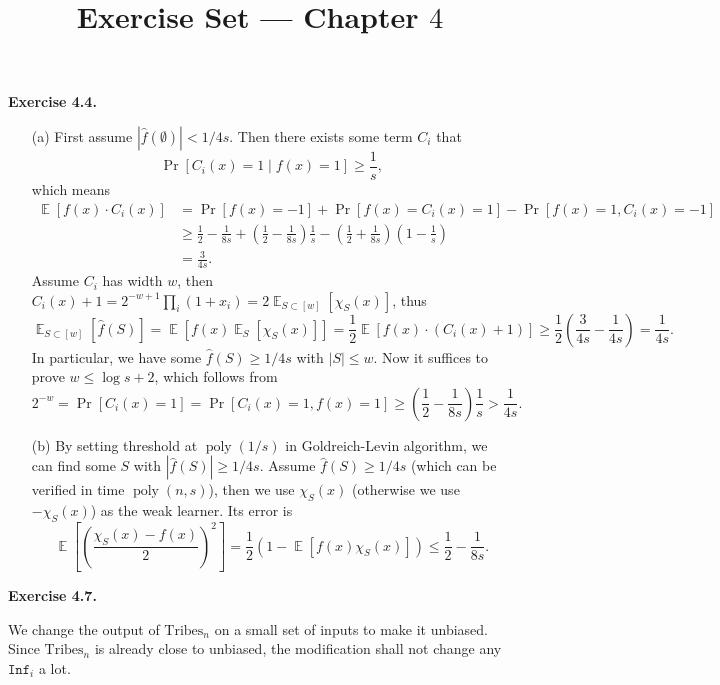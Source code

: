 \documentclass[a4paper]{article}
\title{Exercise Set --- Chapter $4$}
\date{}
\newenvironment{exercise}[1]{
	\par
	\noindent\textbf{Exercise #1.}\quad
}{
	\par
	\bigskip
}
\DeclareMathOperator{\E}{\mathbb E}
\DeclareMathOperator{\poly}{\mathrm{poly}}
\newcommand{\abs}[1]{{\left| #1 \right|}}
\newcommand{\pbra}[1]{{\left( #1 \right)}}
\newcommand{\sbra}[1]{{\left[ #1 \right]}}
\newcommand{\Inf}{\mathtt{Inf}}
\begin{document}
\maketitle

\begin{exercise}{4.4}
    \begin{itemize}
        \item[(a)] First assume $\abs{\hat f(\emptyset)}<1/4s$.
            Then there exists some term $C_i$ that
            $$
            \Pr\sbra{C_i(x)=1\mid f(x)=1}\geq\frac1s,
            $$
            which means
            \begin{align*}
                \E\sbra{f(x)\cdot C_i(x)}
                &=\Pr\sbra{f(x)=-1}+\Pr\sbra{f(x)=C_i(x)=1}-\Pr\sbra{f(x)=1,C_i(x)=-1}\\
                &\geq\frac12-\frac1{8s}+\pbra{\frac12-\frac1{8s}}\frac1s-\pbra{\frac12+\frac1{8s}}\pbra{1-\frac1s}\\
                &=\frac3{4s}.
            \end{align*}
            Assume $C_i$ has width $w$, then $C_i(x)+1=2^{-w+1}\prod_i(1+x_i)=2\E_{S\subset[w]}\sbra{\chi_S(x)}$, thus
            $$
                \E_{S\subset[w]}\sbra{\hat f(S)}
                =\E\sbra{f(x)\E_S\sbra{\chi_S(x)}}
                =\frac12\E\sbra{f(x)\cdot (C_i(x)+1)}
                \geq\frac12\pbra{\frac3{4s}-\frac1{4s}}=\frac1{4s}.
            $$
            In particular, we have some $\hat f(S)\geq1/4s$ with $|S|\leq w$. 
            Now it suffices to prove $w\leq\log s+2$, which follows from 
            $$
            2^{-w}=\Pr\sbra{C_i(x)=1}=\Pr\sbra{C_i(x)=1,f(x)=1}\geq\pbra{\frac12-\frac1{8s}}\frac1s>\frac1{4s}.
            $$
        \item[(b)]
            By setting threshold at $\poly(1/s)$ in Goldreich-Levin algorithm, we can find some $S$ with $\abs{\hat f(S)}\geq1/4s$.
            Assume $\hat f(S)\geq1/4s$ (which can be verified in time $\poly(n,s)$), then we use $\chi_S(x)$ (otherwise we use $-\chi_S(x)$) as the weak learner.
            Its error is 
            $$
            \E\sbra{\pbra{\frac{\chi_S(x)-f(x)}2}^2}=\frac12\pbra{1-\E\sbra{f(x)\chi_S(x)}}\leq\frac12-\frac1{8s}.
            $$
    \end{itemize}
\end{exercise}

\begin{exercise}{4.7}
    We change the output of $\text{Tribes}_n$ on a small set of inputs to make it unbiased. Since $\text{Tribes}_n$ is already close to unbiased, the modification shall not change any $\Inf_i$ a lot.
\end{exercise}
\end{document}

